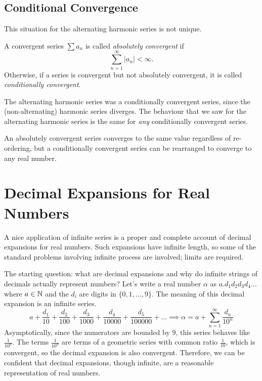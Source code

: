 \documentclass[fleqn,letterpaper]{report}
\begin{document}
\subsection{Conditional Convergence}
\label{conditional-convergence}

This situation for the alternating harmonic series is not
unique. 

\begin{defn}A convergent series $\sum a_n$ is called
\emph{absolutely convergent} if 
\begin{equation*}
\sum_{n=1}^\infty |a_n| < \infty.
\end{equation*}
Otherwise, if a series is convergent but not absolutely
convergent, it is called \emph{conditionally convergent}.
\end{defn}

The alternating harmonic series was a conditionally convergent
series, since the (non-alternating) harmonic series diverges.
The behaviour that we saw for the alternating harmonic series
is the same for \emph{any} conditionally convergent series.

\begin{prop}
An absolutely convergent series converges to the same value
regardless of re-ordering, but a conditionally convergent
series can be rearranged to converge to any real
number.\end{prop}

\section{Decimal Expansions for Real Numbers}
\label{decimal-expansions}

A nice application of infinite series is a proper and complete
account of decimal expansions for real numbers. Such
expansions have infinite length, so some of the standard
problems involving infinite process are involved; limits are
required. 

The starting question: what are decimal expansions and why do
infinite strings of decimals actually represent numbers? Let's
write a real number $\alpha$ as $a.d_1d_2d_3d_4 \ldots $ where
$a \in \mathbb{N}$ and the $d_i$ are digits in $\{0, 1, \ldots, 9\}$.
The meaning of this decimal expansion is an infinite series.
\begin{equation*}
a + \frac{d_1}{10} + \frac{d_2}{100} + \frac{d_3}{1000} + 
\frac{d_4}{10000} + \frac{d_5}{100000} + \ldots \implies 
\alpha = a + \sum_{n=1}^\infty \frac{d_n}{10^n}
\end{equation*}
Asymptotically, since the numerators are bounded by $9$, this
series behaves like $\frac{1}{10^n}$. The terms
$\frac{1}{10^n}$ are terms of a geometric series with common
ratio $\frac{1}{10}$, which is convergent, so the decimal
expansion is also convergent. Therefore, we can be confident
that decimal expansions, though infinite, are a reasonable
representation of real numbers.
\end{document}
